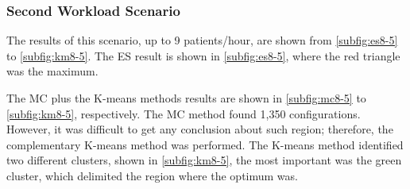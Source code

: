 \subsubsection{Second Workload Scenario}

The results of this scenario, up to 9 patients/hour, are shown from
\ref{subfig:es8-5} to \ref{subfig:km8-5}. The ES result is shown
in \ref{subfig:es8-5}, where the red triangle was the maximum. 

The MC plus the K-means methods results are shown in \ref{subfig:mc8-5}
to \ref{subfig:km8-5}, respectively. The MC method found 1,350 configurations.
However, it was difficult to get any conclusion about such region;
therefore, the complementary K-means method was performed. The K-means
method identified two different clusters, shown in \ref{subfig:km8-5},
the most important was the green cluster, which delimited the region
where the optimum was.

